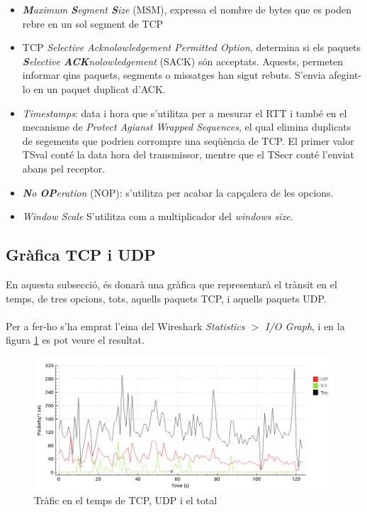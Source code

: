 \documentclass{article}
\begin{document}
\begin{itemize}
\item \textit{\textbf{M}aximum \textbf{S}egment \textbf{S}ize} (MSM), expressa
el nombre de bytes que es poden rebre en un sol segment de TCP
\item TCP \textit{Selective Acknolowledgement Permitted Option},
determina si els paquets \textit{\textbf{S}elective \textbf{ACK}nolowledgement}
(SACK) són acceptats. Aquests, permeten informar qins paquets, segments o 
missatges han sigut rebuts. S'envia afegint-lo en un paquet duplicat d'ACK.
\item \textit{Timestamps}: data i hora 	que s'utilitza per a mesurar el
RTT i també en el mecanisme de \textit{Protect Agianst Wrapped Sequences},
el qual elimina duplicats de segements que podrien corrompre una seqüència de
TCP. El primer valor TSval conté la data  hora del transmissor, mentre que
el TSecr conté l'enviat abans pel receptor.
\item \textit{\textbf{N}o \textbf{OP}eration} (NOP): s'utilitza per acabar la
capçalera de les opcions.
\item \textit{Window Scale} S'utilitza com a multiplicador del \textit{windows
size}.
\end{itemize}
\subsection{Gràfica TCP i UDP}
En aquesta subsecció, és donarà una gràfica que representarà el trànsit en
el temps, de tres opcions, tots, aquells paquets TCP, i aquells paquets UDP.\\
\\
Per a fer-ho s'ha emprat l'eina del Wireshark \textit{Statistics $>$ I/O Graph},
i en la figura \ref{grp:traffic} es pot veure el resultat.
\begin{figure}[!h]
\centering
\includegraphics[scale=0.5]{grp.png}
\caption{Tràfic en el temps de TCP, UDP i el total}
\label{grp:traffic}
\end{figure}
\end{document}
